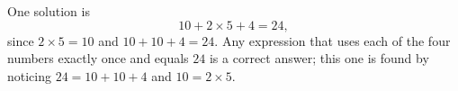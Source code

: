 One solution is
\[
\boxed{10+2\times5+4=24},
\]
since $2\times5=10$ and $10+10+4=24$. Any expression that uses each of the four numbers exactly once and equals $24$ is a correct answer; this one is found by noticing $24=10+10+4$ and $10=2\times5$.
